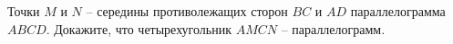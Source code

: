 \begin{ex}
	\begin{condition}
		Точки \( M  \) и \( N  \) – середины противолежащих сторон \( BC \)	и \( AD  \) параллелограмма \( ABCD \). Докажите, что четырехугольник \( AMCN \) – параллелограмм.
	\end{condition}
\end{ex}